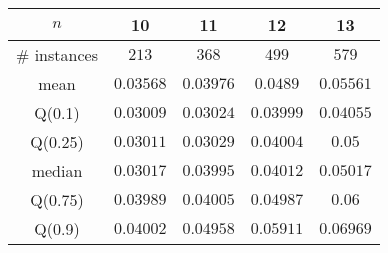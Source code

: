 \begin{tabular}{c|cccc} 
\hline 
$n$ & 10 & 11 & 12 & 13 \tabularnewline 
\hline 
\hline 
\# instances & $213$ & $368$ & $499$ & $579$ \tabularnewline 
mean & $0.03568$ & $0.03976$ & $0.0489$ & $0.05561$ \tabularnewline 
Q(0.1) & $0.03009$ & $0.03024$ & $0.03999$ & $0.04055$ \tabularnewline 
Q(0.25) & $0.03011$ & $0.03029$ & $0.04004$ & $0.05$ \tabularnewline 
median & $0.03017$ & $0.03995$ & $0.04012$ & $0.05017$ \tabularnewline 
Q(0.75) & $0.03989$ & $0.04005$ & $0.04987$ & $0.06$ \tabularnewline 
Q(0.9) & $0.04002$ & $0.04958$ & $0.05911$ & $0.06969$ \tabularnewline 
\hline 
\end{tabular} 
\medskip{} 

